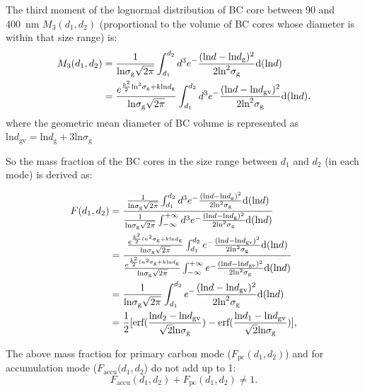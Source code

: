 \documentclass[12pt, fullpage]{uiucthesis2009_2}
\begin{document}
	The third moment of the lognormal distribution of BC core between 90 and 400~nm $M_{3}(d_{1}, d_{2})$ (proportional to the volume of BC cores whose diameter is within that size range) is:
	\begin{align*}
	M_{3}(d_{1}, d_{2}) &= \frac{1}{\text{ln}\sigma_{\text{g}}\sqrt{2\pi}}\int_{d_{1}}^{d_{2}}d^3e^-\frac{(\text{ln}d - \text{ln}d_{\rm g})^2}{2\text{ln}^2\sigma_{\text{g}}}\text{d}(\text{ln}d)  \\
	&=\frac{e^{\frac{k^2}{2}\text{ln}^2\sigma_{\rm g}+k\text{ln}d_{\rm g}}}{\text{ln}\sigma_{\text{g}}\sqrt{2\pi}}\int_{d_{1}}^{d_{2}}d^3e^-\frac{(\text{ln}d - \text{ln}d_{\text{gv}})^2}{2\text{ln}^2\sigma_{\text{g}}}\text{d}(\text{ln}d),
	\end{align*}
	where the geometric mean diameter of BC volume is represented as $\text{ln}d_{\text{gv}}
	= \text{ln}d_{\text{g}} + 3\text{ln}\sigma_{\text{g}}$
	
	So the mass fraction of the BC cores in the size range between $d_{1}$ and $d_{2}$ (in each mode) is derived as:
	
	\begin{align*}
	F(d_{1}, d_{2}) &= \frac{\frac{1}{\text{ln}\sigma_{\text{g}}\sqrt{2\pi}}\int_{d_{1}}^{d_{2}}d^3e^-\frac{(\text{ln}d - \text{ln}d_{\rm g})^2}{2\text{ln}^2\sigma_{\text{g}}}\text{d}(\text{ln}d)}
	{\frac{1}{\text{ln}\sigma_{\text{g}}\sqrt{2\pi}}\int_{-\infty}^{+\infty}d^3e^-\frac{(\text{ln}d - \text{ln}d_{\rm g})^2}{2\text{ln}^2\sigma_{\text{g}}}\text{d}(\text{ln}d)}  \\
	&=\frac{\frac{e^{\frac{k^2}{2}ln^2\sigma_{\rm g}+k\text{ln}d_{\rm g}}}{\text{ln}\sigma_{\text{g}}\sqrt{2\pi}}\int_{d_{1}}^{d_{2}}e^-\frac{(\text{ln}d - \text{ln}d_{\text{gv}})^2}{2\text{ln}^2\sigma_{\text{g}}}\text{d}(\text{ln}d)}{\frac{e^{\frac{k^2}{2}ln^2\sigma_{\rm g}+k\text{ln}d_{\rm g}}}{\text{ln}\sigma_{\text{g}}\sqrt{2\pi}}\int_{-\infty}^{+\infty}e^-\frac{(\text{ln}d - \text{ln}d_{\text{gv}})^2}{2\text{ln}^2\sigma_{\text{g}}}\text{d}(\text{ln}d)}\\
	&=\frac{1}{\text{ln}\sigma_{\text{g}}\sqrt{2\pi}}\int_{d_{1}}^{d_{2}}e^-\frac{(\text{ln}d - \text{ln}d_{\text{gv}})^2}{2\text{ln}^2\sigma_{\text{g}}}\text{d}(\text{ln}d) \\
	&=\frac{1}{2}[\text{erf}(\frac{\text{ln}d_{2} - \text{ln}d_{\text{gv}}}{\sqrt{2}\text{ln}\sigma_{\rm g}})-\text{erf}(\frac{\text{ln}d_{1} - \text{ln}d_{\text{gv}}}{\sqrt{2}\text{ln}\sigma_{\rm g}})],
	\end{align*}
	
	The above mass fraction for primary carbon mode ($F_{\text{pc}}(d_{1}, d_{2})$) and for accumulation mode ($F_{\text{accu}}(d_{1}, d_{2}$) do not add up to 1:
	\[F_{\text{accu}}(d_{1}, d_{2}) + F_{\text{pc}}(d_{1}, d_{2}) \neq 1.\]
	
\end{document}
